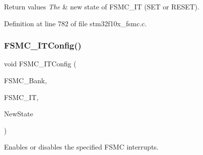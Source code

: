 \begin{DoxyRetVals}{Return values}
{\em The} & new state of F\+S\+M\+C\+\_\+\+IT (S\+ET or R\+E\+S\+ET). \\
\hline
\end{DoxyRetVals}


Definition at line 782 of file stm32f10x\+\_\+fsmc.\+c.

\mbox{\label{group___f_s_m_c___private___functions_ga217027ae3cd213b9076b6a1be197064c}} 
\subsubsection{\texorpdfstring{F\+S\+M\+C\+\_\+\+I\+T\+Config()}{FSMC\_ITConfig()}}
{\footnotesize\ttfamily void F\+S\+M\+C\+\_\+\+I\+T\+Config (\begin{DoxyParamCaption}\item[{uint32\+\_\+t}]{F\+S\+M\+C\+\_\+\+Bank,  }\item[{uint32\+\_\+t}]{F\+S\+M\+C\+\_\+\+IT,  }\item[{\hyperlink{group___exported__types_gac9a7e9a35d2513ec15c3b537aaa4fba1}{Functional\+State}}]{New\+State }\end{DoxyParamCaption})}



Enables or disables the specified F\+S\+MC interrupts. 


